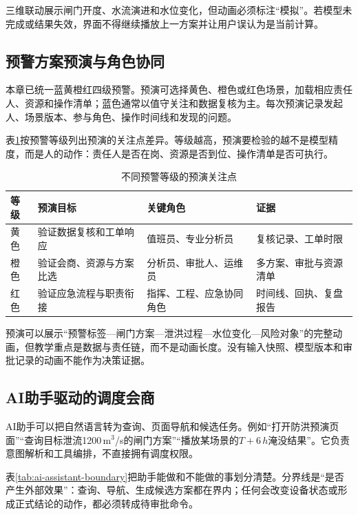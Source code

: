 三维联动展示闸门开度、水流演进和水位变化，但动画必须标注“模拟”。若模型未完成或结果失效，界面不得继续播放上一方案并让用户误认为是当前计算。

\subsection{预警方案预演与角色协同}

本章已统一蓝黄橙红四级预警。预演可选择黄色、橙色或红色场景，加载相应责任人、资源和操作清单；蓝色通常以值守关注和数据复核为主。每次预演记录发起人、场景版本、参与角色、操作时间线和发现的问题。

表\ref{tab:warning-rehearsal}按预警等级列出预演的关注点差异。等级越高，预演要检验的越不是模型精度，而是人的动作：责任人是否在岗、资源是否到位、操作清单是否可执行。

\begin{table}[htbp]
\centering
\caption{不同预警等级的预演关注点}
\label{tab:warning-rehearsal}
\begin{tabular}{p{1.7cm}p{3.7cm}p{4.2cm}p{3.2cm}}
\toprule
等级 & 预演目标 & 关键角色 & 证据 \\
\midrule
黄色 & 验证数据复核和工单响应 & 值班员、专业分析员 & 复核记录、工单时限 \\
橙色 & 验证会商、资源与方案比选 & 分析员、审批人、运维员 & 多方案、审批与资源清单 \\
红色 & 验证应急流程与职责衔接 & 指挥、工程、应急协同角色 & 时间线、回执、复盘报告 \\
\bottomrule
\end{tabular}
\end{table}

预演可以展示“预警标签—闸门方案—泄洪过程—水位变化—风险对象”的完整动画，但教学重点是数据与责任链，而不是动画长度。没有输入快照、模型版本和审批记录的动画不能作为决策证据。

\subsection{AI助手驱动的调度会商}

AI助手可以把自然语言转为查询、页面导航和候选任务。例如“打开防洪预演页面”“查询目标泄流1200\,m$^3$/s的闸门方案”“播放某场景的$T+6\,h$淹没结果”。它负责意图解析和工具编排，不直接拥有调度权限。

表\ref{tab:ai-assistant-boundary}把助手能做和不能做的事划分清楚。分界线是“是否产生外部效果”：查询、导航、生成候选方案都在界内；任何会改变设备状态或形成正式结论的动作，都必须转成待审批命令。

